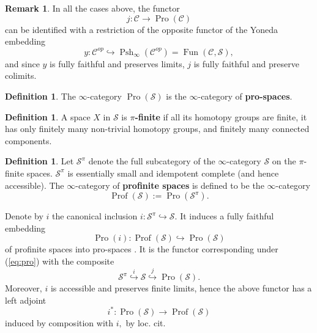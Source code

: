 \documentclass[12pt]{amsart}
\theoremstyle{definition}
\newtheorem{definition}[dummy]{Definition}
\newtheorem{remark}[dummy]{Remark}
\newcommand{\cS}{\mathcal{S}}
\newcommand{\sC}{\mathscr{C}}
\renewcommand{\i}{\infty}
\def\Pro{\operatorname{Pro}}
\def\Fun{\operatorname{Fun}}
\def\Pshi{\operatorname{Psh}_\i}
\def\Profs{\operatorname{Prof}\left(\cS\right)}
\def\Prof{\operatorname{Prof}}
\begin{document}
\begin{remark}
In all the cases above, the functor $$j:\sC \to \Pro\left(\sC\right)$$ can be identified with a restriction of the opposite functor of the Yoneda embedding $$y:\sC^{op} \hookrightarrow \Pshi\left(\sC^{op}\right)=\Fun\left(\sC,\cS\right),$$ and since $y$ is fully faithful and preserves limits, $j$ is fully faithful and preserve colimits.
\end{remark}

\begin{definition}
The $\i$-category $\Pro\left(\cS\right)$ is the $\i$-category of \textbf{pro-spaces}.
\end{definition}

\begin{definition}\label{dfn:pi-finite}
A space $X$ in $\cS$ is \textbf{$\pi$-finite} if all its homotopy groups are finite, it has only finitely many non-trivial homotopy groups, and finitely many connected components.
\end{definition}

\begin{definition}
Let $\cS^{\pi}$ denote the full subcategory of the $\i$-category $\cS$ on the $\pi$-finite spaces. $\cS^{\pi}$ is essentially small and idempotent complete (and hence accessible). The $\i$-category of \textbf{profinite spaces} is defined to be the $\i$-category $$\Profs := \Pro\left(\cS^{\pi}\right).$$
\end{definition}

Denote by $i$ the canonical inclusion $i:\cS^{\pi} \hookrightarrow \cS.$
It induces a fully faithful embedding 
$$\Pro\left(i\right):\Prof\left(\cS\right) \hookrightarrow \Pro\left(\cS\right)$$
of profinite spaces into pro-spaces \cite[Remark 3.1.7]{dagxiii}. It is the functor corresponding under (\ref{eq:pro}) with the composite 
$$\cS^{\pi} \stackrel{i}{\hookrightarrow} \cS \stackrel{j}{\hookrightarrow} \Pro\left(\cS\right).$$
Moreover, $i$ is accessible and preserves finite limits, hence the above functor has a left adjoint $$i^*:\Pro\left(\cS\right) \to \Prof\left(\cS\right)$$ induced by composition with $i,$ by loc. cit.
\end{document}
